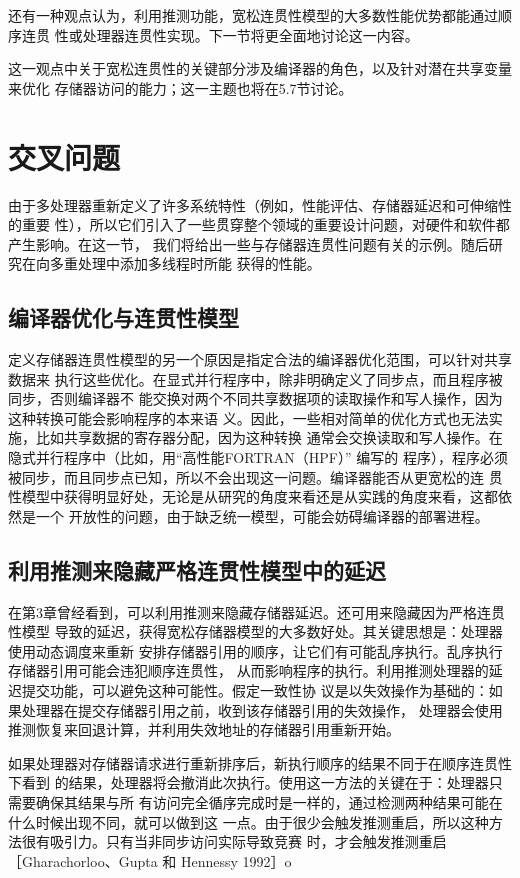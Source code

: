 还有一种观点认为，利用推测功能，宽松连贯性模型的大多数性能优势都能通过顺序连贯
性或处理器连贯性实现。下一节将更全面地讨论这一内容。

这一观点中关于宽松连贯性的关键部分涉及编译器的角色，以及针对潜在共享变量来优化
存储器访问的能力；这一主题也将在5.7节讨论。

\section{交叉问题}
由于多处理器重新定义了许多系统特性（例如，性能评估、存储器延迟和可伸缩性的重要
性），所以它们引入了一些贯穿整个领域的重要设计问题，对硬件和软件都产生影响。在这一节，
我们将给出一些与存储器连贯性问题有关的示例。随后研究在向多重处理中添加多线程时所能
获得的性能。

\subsection{编译器优化与连贯性模型}
定义存储器连贯性模型的另一个原因是指定合法的编译器优化范围，可以针对共享数据来
执行这些优化。在显式并行程序中，除非明确定义了同步点，而且程序被同步，否则编译器不
能交换对两个不同共享数据项的读取操作和写人操作，因为这种转换可能会影响程序的本来语
义。因此，一些相对简单的优化方式也无法实施，比如共享数据的寄存器分配，因为这种转换
通常会交换读取和写人操作。在隐式并行程序中（比如，用“高性能FORTRAN（HPF）” 编写的
程序），程序必须被同步，而且同步点已知，所以不会出现这一问题。编译器能否从更宽松的连
贯性模型中获得明显好处，无论是从研究的角度来看还是从实践的角度来看，这都依然是一个
开放性的问题，由于缺乏统一模型，可能会妨碍编译器的部署进程。

\subsection{利用推测来隐藏严格连贯性模型中的延迟}
在第3章曾经看到，可以利用推测来隐藏存储器延迟。还可用来隐藏因为严格连贯性模型
导致的延迟，获得宽松存储器模型的大多数好处。其关键思想是：处理器使用动态调度来重新
安排存储器引用的顺序，让它们有可能乱序执行。乱序执行存储器引用可能会违犯顺序连贯性，
从而影响程序的执行。利用推测处理器的延迟提交功能，可以避免这种可能性。假定一致性协
议是以失效操作为基础的：如果处理器在提交存储器引用之前，收到该存储器引用的失效操作，
处理器会使用推测恢复来回退计算，并利用失效地址的存储器引用重新开始。

如果处理器对存储器请求进行重新排序后，新执行顺序的结果不同于在顺序连贯性下看到
的结果，处理器将会撤消此次执行。使用这一方法的关键在于：处理器只需要确保其结果与所
有访问完全循序完成时是一样的，通过检测两种结果可能在什么时候出现不同，就可以做到这
一点。由于很少会触发推测重启，所以这种方法很有吸引力。只有当非同步访问实际导致竞赛
时，才会触发推测重启［Gharachorloo、Gupta 和 Hennessy 1992］o

